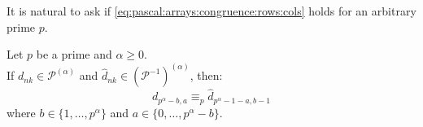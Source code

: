 It is natural to ask if \autoref{eq:pascal:arrays:congruence:rows:cols}
holds for an arbitrary prime $p$.
\begin{conjecture}
    Let $p$ be a prime and $\alpha\geq0$. \\
    If $d_{nk}\in\mathcal{P}^{(\alpha)}$ and
    $\hat{d}_{nk}\in\left(\mathcal{P}^{-1}\right)^{(\alpha)}$, then:
    \begin{equation}
        d_{p^\alpha -b,a} \equiv_{p} \hat{d}_{p^\alpha -1-a,b-1} 
    \end{equation}
    where $b\in\lbrace1,\ldots,p^{\alpha}\rbrace$ and 
    $a\in\lbrace 0,\ldots,p^{\alpha}-b\rbrace$.

\end{conjecture}
